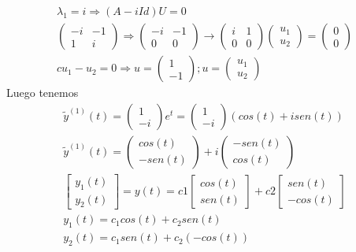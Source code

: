 \documentclass[12pt,spanish,lettersize]{report}
\begin{document}
\begin{eqnarray}
\nonumber \lambda_1=i\Rightarrow(A-iId)U=0\\
\nonumber \left(\begin{array}{cc}
-i & -1\\
1 & i
\end{array}\right)\Rightarrow\left(\begin{array}{cc}
-i & -1\\
0 & 0
\end{array}\right)\rightarrow\left(\begin{array}{cc}
i & 1\\
0 & 0
\end{array}\right)\left(\begin{array}{c}
u_1\\
u_2
\end{array}\right)=\left(\begin{array}{c}
0\\
0
\end{array}\right)\\
cu_1-u_2=0 \Rightarrow u=\left(\begin{array}{c}
1\\
-1
\end{array}\right); u=\left(\begin{array}{c}
u_1\\
u_2
\end{array}\right)
\end{eqnarray}
Luego tenemos
\begin{eqnarray}
\tilde{y}^{(1)}(t)=\left(\begin{array}{c}
1\\
-i
\end{array}
\right)e^t=\left(\begin{array}{c}
1\\
-i
\end{array}
\right)(cos(t)+isen(t))\\
\nonumber \tilde{y}^{(1)}(t)=\left(\begin{array}{c}
cos(t)\\
-sen(t)
\end{array}
\right)+i\left(\begin{array}{c}
-sen(t)\\
cos(t)
\end{array}
\right)\\
\left[\begin{array}{c}
y_1(t)\\
y_2(t)\end{array}\right]=y(t)=c1\left[\begin{array}{c}
cos(t)\\
sen(t)\end{array}\right]+c2\left[\begin{array}{c}
sen(t)\\
-cos(t)\end{array}\right]\\
y_1(t)=c_1cos(t)+c_2sen(t)\\
y_2(t)=c_1sen(t)+c_2(-cos(t))
\end{eqnarray}
\end{document}
